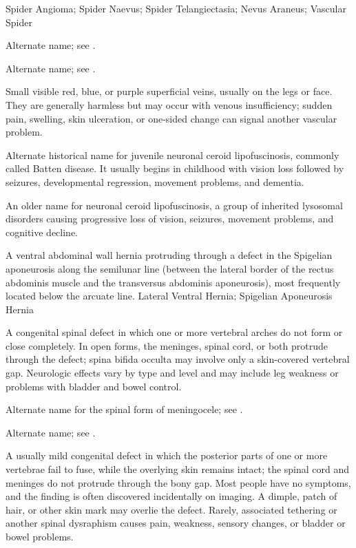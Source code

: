 \synonyms
Spider Angioma; Spider Naevus; Spider Telangiectasia; Nevus Araneus; Vascular Spider

 Alternate name; see .

 Alternate name; see .

 Small visible red, blue, or purple superficial veins, usually on the legs or face. They are generally harmless but may occur with venous insufficiency; sudden pain, swelling, skin ulceration, or one-sided change can signal another vascular problem.

 Alternate historical name for juvenile neuronal ceroid lipofuscinosis, commonly called Batten disease. It usually begins in childhood with vision loss followed by seizures, developmental regression, movement problems, and dementia.

 An older name for neuronal ceroid lipofuscinosis, a group of inherited lysosomal disorders causing progressive loss of vision, seizures, movement problems, and cognitive decline.

 A ventral abdominal wall hernia protruding through a defect in the Spigelian aponeurosis along the semilunar line (between the lateral border of the rectus abdominis muscle and the transversus abdominis aponeurosis), most frequently located below the arcuate line.
\synonyms
Lateral Ventral Hernia; Spigelian Aponeurosis Hernia

 A congenital spinal defect in which one or more vertebral arches
do not form or close completely. In open forms, the meninges, spinal cord, or both
protrude through the defect; spina bifida occulta may involve only a skin-covered
vertebral gap. Neurologic effects vary by type and level and may include leg weakness
or problems with bladder and bowel control.

 Alternate name for the spinal form of meningocele; see .

 Alternate name; see .

 A usually mild congenital defect in which the posterior parts of one or more vertebrae fail to fuse,
while the overlying skin remains intact; the spinal cord and meninges do not protrude through the bony gap. Most people
have no symptoms, and the finding is often discovered incidentally on imaging. A dimple, patch of hair, or other skin
mark may overlie the defect. Rarely, associated tethering or another spinal dysraphism causes pain, weakness, sensory
changes, or bladder or bowel problems.

